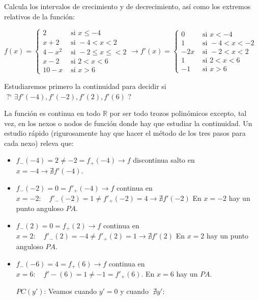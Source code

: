 	\begin{ejem} Calcula los intervalos de crecimiento y de decrecimiento, así como los extremos relativos de la función:
	\label{ejem:extremos-trozos}
	
	$f(x)=\begin{cases}
	  2 & \mbox{ si } x\le -4  \\
	   x + 2& \mbox{ si }  -4<x<2 \\
	 4-x^2 & \mbox{ si } -2 \le x \le <2  \\
	  x-2 & \mbox{ si } 2< x <6  \\
	  10-x& \mbox{ si } x>6   
	\end{cases} \to 
	f'(x)=
	\begin{cases}
	  0 & \mbox{ si } x< -4  \\
	  1 & \mbox{ si }  -4<x < -2 \\
	 -2x & \mbox{ si } -2<x<2  \\
	  1 & \mbox{ si } 2 < x < 6  \\
	  -1 & \mbox{ si } x>6   
	\end{cases}
	$
	
	Estudiaremos primero la continuidad para decidir si $\mbox{ ?` } \exists f'(-4), f'(-2), f'(2), f'(6) \mbox { ? }$
	
	La función es continua en todo $\mathbb R$ por ser todo trozos polinómicos excepto, tal vez, en los nexos o nodos de función donde hay que estudiar  la continuidad. Un estudio rápido (rigurosamente hay que hacer el método de los tres pasos para cada nexo) releva que:
	
		
	\begin{itemize}

	\item $f_-(-4)=2 \neq -2 =f_+(-4) \to f $ discontinua salto en $x=-4 \to \nexists  f'(-4)$. 
	
	\item $f_-(-2)=0=f'_+(-4) \to f $ continua en $x=-2:\quad f'_-(-2)=1	\neq f'_+(-2)=4 \to \nexists f'(-2)$ En $x=-2$ hay un punto anguloso $PA$.
	
	\item $f_-(2)=0=f_+(2) \to f $ continua en $x=2:\quad f'_-(2)=-4 	\neq f'_+(2)=1 \to \nexists f'(2)$ En $x=2$ hay un punto anguloso $PA$.
	
	\item $f_-(-6)=4=f_+(6) \to f $ continua en $x=6:\quad f'-(6)=1 \neq -1 =f'_+(6)$. En $x=6$ hay un $PA$. 
	
	$PC(y')$: Veamos cuando $y'=0$ y cuando $\; \nexists y'$:
	

\end{itemize}
\end{ejem}
